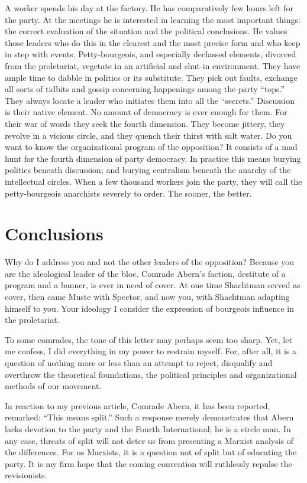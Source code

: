A worker spends his day at the factory. He has comparatively few hours left for the party. At the meetings he is interested in learning the most important things: the correct evaluation of the situation and the political conclusions. He values those leaders who do this in the clearest and the most precise form and who keep in step with events. Petty-bourgeois, and especially declassed elements, divorced from the proletariat, vegetate in an artificial and shut-in environment. They have ample time to dabble in politics or its substitute. They pick out faults, exchange all sorts of tidbits and gossip concerning happenings among the party “tops.” They always locate a leader who initiates them into all the “secrets.” Discussion is their native element. No amount of democracy is ever enough for them. For their war of words they seek the fourth dimension. They become jittery, they revolve in a vicious circle, and they quench their thirst with salt water. Do you want to know the organizational program of the opposition? It consists of a mad hunt for the fourth dimension of party democracy. In practice this means burying politics beneath discussion; and burying centralism beneath the anarchy of the intellectual circles. When a few thousand workers join the party, they will call the petty-bourgeois anarchists severely to order. The sooner, the better.

\section*{Conclusions}

Why do I address you and not the other leaders of the opposition? Because you are the ideological leader of the bloc. Comrade Abern’s faction, destitute of a program and a banner, is ever in need of cover. At one time Shachtman served as cover, then came Muste with Spector, and now you, with Shachtman adapting himself to you. Your ideology I consider the expression of bourgeois influence in the proletariat.

To some comrades, the tone of this letter may perhaps seem too sharp. Yet, let me confess, I did everything in my power to restrain myself. For, after all, it is a question of nothing more or less than an attempt to reject, disqualify and overthrow the theoretical foundations, the political principles and organizational methods of our movement.

In reaction to my previous article, Comrade Abern, it has been reported, remarked: “This means split.” Such a response merely demonstrates that Abern lacks devotion to the party and the Fourth International; he is a circle man. In any case, threats of split will not deter us from presenting a Marxist analysis of the differences. For us Marxists, it is a question not of split but of educating the party. It is my firm hope that the coming convention will ruthlessly repulse the revisionists.

